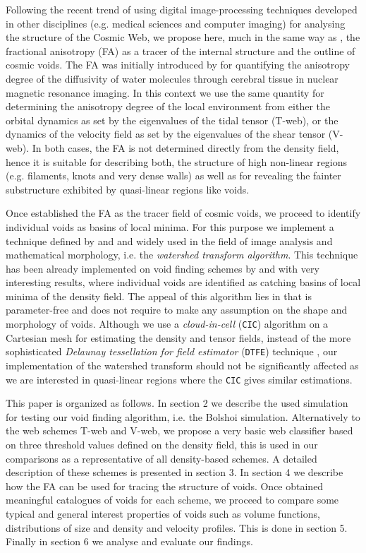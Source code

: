 \documentclass[a4,useAMS,usenatbib,usegraphicx]{latex/mn2e}
\begin{document}
Following the recent trend of using digital image-processing techniques 
developed in other disciplines (e.g. medical sciences and computer imaging) 
for analysing the structure of the Cosmic Web, we propose here, much in 
the same way as \citet{Libeskind13}, the fractional anisotropy (FA) as a 
tracer of the internal structure and the outline of cosmic voids. The FA 
was initially introduced by \citet{Basser95} for quantifying the 
anisotropy degree of the diffusivity of water molecules through cerebral
tissue in nuclear magnetic resonance imaging. In this context we use the 
same quantity for determining the anisotropy degree of the local 
environment from either the orbital dynamics as set by the eigenvalues of
the tidal tensor (T-web), or the dynamics of the velocity field as set by 
the eigenvalues of the shear tensor (V-web). In both cases, the FA is not
determined directly from the density field, hence it is suitable for 
describing both, the structure of high non-linear regions (e.g. filaments,
knots and very dense walls) as well as for revealing the fainter 
substructure exhibited by quasi-linear regions like voids.


Once established the FA as the tracer field of cosmic voids, we proceed to
identify individual voids as basins of local minima. For this purpose we
implement a technique defined by \citet{Beucher79} and \citet{Beucher93} 
and widely used in the field of image analysis and mathematical morphology, 
i.e. the \textit{watershed transform algorithm}. This technique has been 
already implemented on void finding schemes by \citet{Platen07} and 
\citet{Neyrinck08} with very interesting results, where individual voids 
are identified as catching basins of local minima of the density field. 
The appeal of this algorithm lies in that is parameter-free and does not 
require to make any assumption on the shape and morphology of voids. 
Although we use a \textit{cloud-in-cell} (\texttt{CIC}) algorithm on a 
Cartesian mesh for estimating the density and tensor fields, instead of 
the more sophisticated \textit{Delaunay tessellation for field estimator} 
(\texttt{DTFE}) technique \citep{Schaap00}, our implementation of the 
watershed transform should not be significantly affected as we are 
interested in quasi-linear regions where the \texttt{CIC} gives similar 
estimations.


This paper is organized as follows. In section 2 we describe the used
simulation for testing our void finding algorithm, i.e. the Bolshoi
simulation. Alternatively to the web schemes T-web and V-web, we propose 
a very basic web classifier based on three threshold values defined on the
density field, this is used in our comparisons as a representative of all 
density-based schemes. A detailed description of these schemes is 
presented in section 3. In section 4 we describe how the FA can be used 
for tracing the structure of voids. Once obtained meaningful catalogues of 
voids for each scheme, we proceed to compare some typical and general 
interest properties of voids such as volume functions, distributions of 
size and density and velocity profiles. This is done in section 5. Finally
in section 6 we analyse and evaluate our findings.
\end{document}
